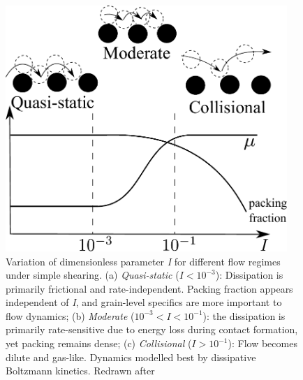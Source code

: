 \begin{figure}[tbhp]
\centering
\includegraphics[width=0.95\textwidth]{Regime}
\caption[Variation of dimensionless parameter \textit{I} for different flow 
regimes]{Variation of dimensionless parameter \textit{I} for different 
flow regimes under simple shearing. (a) \textit{Quasi-static} ($I < 10^{-3}$): 
Dissipation is primarily frictional and rate-independent. Packing fraction 
appears independent of \textit{I}, and grain-level specifics are more important 
to flow dynamics; (b) \textit{Moderate} ($10^{-3} < I < 
10^{-1}$): the dissipation is primarily rate-sensitive due to energy loss 
during contact formation, yet packing remains dense; (c) \textit{Collisional} 
($I > 10^{-1}$): Flow becomes dilute and gas-like. Dynamics modelled best by 
dissipative Boltzmann kinetics. Redrawn after~\citep{Kamrin2008}}
\label{fig:Regime}
\end{figure}

